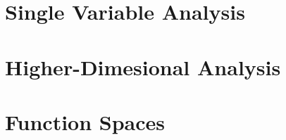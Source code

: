 \documentclass[12pt, a4paper, oneside, openright, titlepage]{book}
\begin{document}
\tableofcontents

\part{Single Variable Analysis}


















\part{Higher-Dimesional Analysis}





























\part{Function Spaces}
\end{document}
